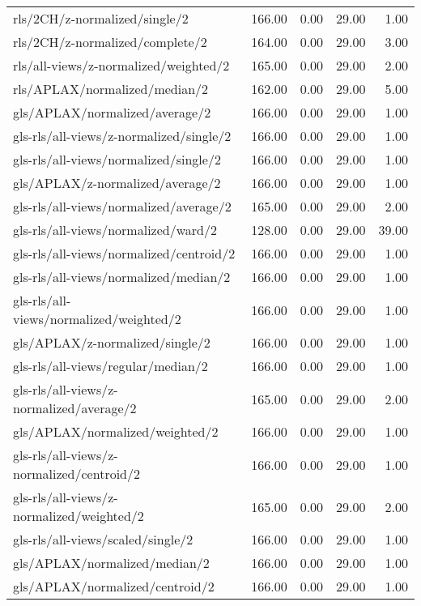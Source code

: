 \begin{longtable}{lrrrr}
    rls/2CH/z-normalized/single/2             & 166.00 &  0.00 & 29.00 &  1.00 \\
    rls/2CH/z-normalized/complete/2           & 164.00 &  0.00 & 29.00 &  3.00 \\
    rls/all-views/z-normalized/weighted/2     & 165.00 &  0.00 & 29.00 &  2.00 \\
    rls/APLAX/normalized/median/2             & 162.00 &  0.00 & 29.00 &  5.00 \\
    gls/APLAX/normalized/average/2            & 166.00 &  0.00 & 29.00 &  1.00 \\
    gls-rls/all-views/z-normalized/single/2   & 166.00 &  0.00 & 29.00 &  1.00 \\
    gls-rls/all-views/normalized/single/2     & 166.00 &  0.00 & 29.00 &  1.00 \\
    gls/APLAX/z-normalized/average/2          & 166.00 &  0.00 & 29.00 &  1.00 \\
    gls-rls/all-views/normalized/average/2    & 165.00 &  0.00 & 29.00 &  2.00 \\
    gls-rls/all-views/normalized/ward/2       & 128.00 &  0.00 & 29.00 & 39.00 \\
    gls-rls/all-views/normalized/centroid/2   & 166.00 &  0.00 & 29.00 &  1.00 \\
    gls-rls/all-views/normalized/median/2     & 166.00 &  0.00 & 29.00 &  1.00 \\
    gls-rls/all-views/normalized/weighted/2   & 166.00 &  0.00 & 29.00 &  1.00 \\
    gls/APLAX/z-normalized/single/2           & 166.00 &  0.00 & 29.00 &  1.00 \\
    gls-rls/all-views/regular/median/2        & 166.00 &  0.00 & 29.00 &  1.00 \\
    gls-rls/all-views/z-normalized/average/2  & 165.00 &  0.00 & 29.00 &  2.00 \\
    gls/APLAX/normalized/weighted/2           & 166.00 &  0.00 & 29.00 &  1.00 \\
    gls-rls/all-views/z-normalized/centroid/2 & 166.00 &  0.00 & 29.00 &  1.00 \\
    gls-rls/all-views/z-normalized/weighted/2 & 165.00 &  0.00 & 29.00 &  2.00 \\
    gls-rls/all-views/scaled/single/2         & 166.00 &  0.00 & 29.00 &  1.00 \\
    gls/APLAX/normalized/median/2             & 166.00 &  0.00 & 29.00 &  1.00 \\
    gls/APLAX/normalized/centroid/2           & 166.00 &  0.00 & 29.00 &  1.00 \\

\end{longtable}
